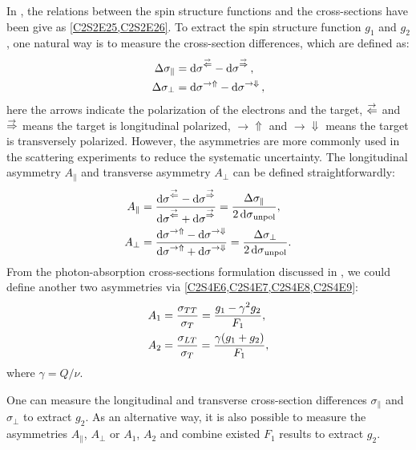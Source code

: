 In , the relations between the spin structure functions and the cross-sections have been give as \cref{C2S2E25,C2S2E26}. To extract the spin structure function $g_1$ and $g_2$, one natural way is to measure the cross-section differences, which are defined as:
\begin{align} \label{C4S1E1}
\Delta\sigma_{\parallel} & = \dd{\sigma}^{\buildrel\rightarrow\over\Leftarrow}-\dd{\sigma}^{\buildrel\rightarrow\over\Rightarrow}, \\ \label{C4S1E2}
\Delta\sigma_{\perp} & = \dd{\sigma}^{\rightarrow\Uparrow}-\dd{\sigma}^{\rightarrow\Downarrow},
\end{align}
here the arrows indicate the polarization of the electrons and the target, $\buildrel\rightarrow\over\Leftarrow$ and $\buildrel\rightarrow\over\Rightarrow$ means the target is longitudinal polarized, $\rightarrow\Uparrow$ and $\rightarrow\Downarrow$ means the target is transversely polarized. However, the asymmetries are more commonly used in the scattering experiments to reduce the systematic uncertainty. The longitudinal asymmetry $A_{\parallel}$ and transverse asymmetry $A_{\perp}$ can be defined straightforwardly:
\begin{align} \label{C4S1E3}
A_{\parallel} & = \frac{\dd{\sigma}^{\buildrel\rightarrow\over\Leftarrow}-\dd{\sigma}^{\buildrel\rightarrow\over\Rightarrow}}{\dd{\sigma}^{\buildrel\rightarrow\over\Leftarrow}+\dd{\sigma}^{\buildrel\rightarrow\over\Rightarrow}} = \frac{\Delta\sigma_{\parallel}}{2\dd{\sigma}_{\mathrm{unpol}}}, \\ \label{C4S1E4}
A_{\perp} & = \frac{\dd{\sigma}^{\rightarrow\Uparrow}-\dd{\sigma}^{\rightarrow\Downarrow}}{\dd{\sigma}^{\rightarrow\Uparrow}+\dd{\sigma}^{\rightarrow\Downarrow}} = \frac{\Delta\sigma_{\perp}}{2\dd{\sigma}_{\mathrm{unpol}}}.
\end{align}
From the photon-absorption cross-sections formulation discussed in , we could define another two asymmetries via \cref{C2S4E6,C2S4E7,C2S4E8,C2S4E9}:
\begin{align} \label{C4S1E5}
A_1 & = \frac{\sigma_{TT}}{\sigma_{T}} = \frac{g_1-\gamma^2g_2}{F_1}, \\ \label{C4S1E6}
A_2 & = \frac{\sigma_{LT}}{\sigma_{T}} = \frac{\gamma(g_1+g_2)}{F_1},
\end{align}
where $\gamma=Q/\nu$.

One can measure the longitudinal and transverse cross-section differences $\sigma_\parallel$ and $\sigma_\perp$ to extract $g_2$. As an alternative way, it is also possible to measure the asymmetries $A_\parallel$, $A_\perp$ or $A_1$, $A_2$ and combine existed $F_1$ results to extract $g_2$.

